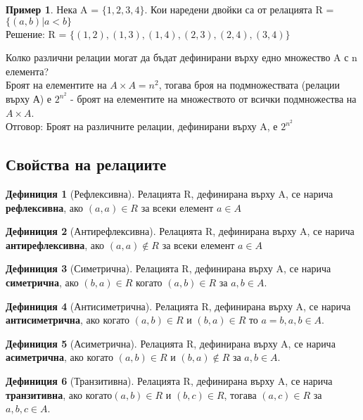\documentclass[fleqn, 12pt]{article}
\theoremstyle{definition}
\newtheorem{example}{Пример}[subsection]
\newtheorem{definition}{Дефиниция}[subsection]
\begin{document}
\begin{example}
Нека A = $\{1, 2, 3, 4\}$. Кои наредени двойки са от релацията R = $\{(a, b) | a < b\}$ \\
Решение: R =  $\{(1, 2), (1, 3), (1, 4), (2, 3), (2, 4), (3, 4) \}$
\end{example}
Колко различни релации могат да бъдат дефинирани върху едно множество A с n елемента? \\
Броят на елементите на $A \times A = n^2$, тогава броя на подмножествата (релации върху А) е $2^{n^2}$ - броят на елементите на множеството от всички подмножества на $A \times A$.\\
Отговор: Броят на различните релации, дефинирани върху A, е $2^{n^2}$

\subsection{Свойства на релациите}
 
\begin{definition}[Рефлексивна]
Релацията R, дефинирана върху A, се нарича \textbf{рефлексивна}, ако $(a, a) \in R $ за всеки елемент $a \in A$
\end{definition}

\begin{definition}[Антирефлексивна]
Релацията R, дефинирана върху A, се нарича \textbf{антирефлексивна}, ако $(a, a) \notin R $ за всеки елемент $a \in A$
\end{definition}

\begin{definition}[Симетрична]
Релацията R, дефинирана върху A, се нарича \textbf{симетрична}, ако $(b, a) \in R$ когато $(a, b) \in R $ за $a, b \in A$. 
\end{definition}

\begin{definition}[Антисиметрична]
Релацията R, дефинирана върху A, се нарича \textbf{антисиметрична}, ако когато $(a, b) \in R $ и $(b, a) \in R$ то $a = b, a,b \in A$. 
\end{definition}

\begin{definition}[Асиметрична]
Релацията R, дефинирана върху A, се нарича \textbf{асиметрична}, ако когато $(a, b) \in R $ и $(b, a) \notin R$ за $a,b \in A$. 
\end{definition}

\begin{definition}[Транзитивна]
Релацията R, дефинирана върху A, се нарича \textbf{транзитивна}, ако когато$(a, b)\in R$ и $(b,c) \in R$, тогава $(a, c)\in R$ за $a, b, c \in A$. 
\end{definition}
\end{document}
